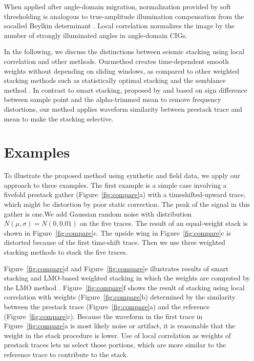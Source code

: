 When applied after angle-domain migration, normalization provided by soft 
thresholding is analogous to true-amplitude illumination compensation from the 
socalled Beylkin determinant \cite[]{Albertin99,Audebert05}. Local correlation 
normalizes the image by the number of strongly illuminated angles in 
angle-domain CIGs.

In the following, we discuss the distinctions between seismic
stacking using local correlation and other methods. Ourmethod creates
time-dependent smooth weights without depending on sliding
windows, as compared to other weighted stacking methods such as
statistically optimal stacking \cite[]{Robinson70,Neelamani06} and 
the semblance method \cite[]{Yilmaz01}. In contrast to
smart stacking, proposed by \cite[]{Rashed08} and based on sign difference
between sample point and the alpha-trimmed mean to remove
frequency distortions, our method applies waveform similarity between
prestack trace and mean to make the stacking selective.

 \section{Examples}

To illustrate the proposed method using synthetic and field data,
we apply our approach to three examples. The first example is a simple
case involving a fivefold prestack gather (Figure~\ref{fig:compare}a) with a 
timeshifted-upward trace, which might be distortion by poor static correction.
The peak of the signal in this gather is one.We add Gaussian
random noise with distribution $N(\mu,\sigma)=N(0,0.01)$ on the five
traces. The result of an equal-weight stack is shown in 
Figure~\ref{fig:compare}c. The upside wing in Figure~\ref{fig:compare}c is 
distorted because of the first time-shift
trace. Then we use three weighted stacking methods to stack the five
traces.

Figure~\ref{fig:compare}d and Figure~\ref{fig:compare}e illustrates results 
of smart stacking \cite[]{Rashed08} and LMO-based weighted stacking in which 
the weights are computed by the LMO method \cite[]{Robinson70,Neelamani06}. 
Figure~\ref{fig:compare}f shows the result of stacking using local correlation
with weights (Figure~\ref{fig:compare}b) determined by the similarity between 
the prestack trace (Figure~\ref{fig:compare}a) and the reference 
(Figure~\ref{fig:compare}c). Because the waveform in the first trace in 
Figure~\ref{fig:compare}a is most likely 
noise or artifact, it is reasonable that the weight in the stack procedure is 
lower. Use of local correlation as weights of prestack traces lets us select
those portions, which are more similar to the reference trace to contribute
to the stack.

